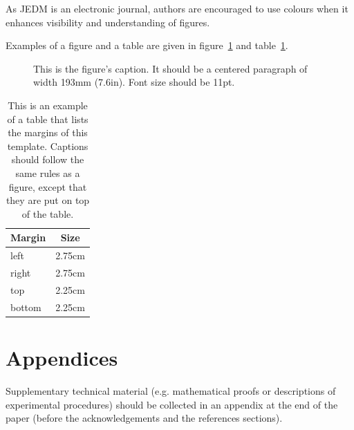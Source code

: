 \documentclass[a4,notitlepage,12pt]{jedm}
\begin{document}
As JEDM is an electronic journal, authors are encouraged to use colours when it enhances visibility and understanding of figures.

Examples of a figure and a table are given in figure~\ref{tab:fig1} and table~\ref{tab:1}.

\begin{figure}
  \centerline{}
  \caption{This is the figure's caption.  It should be a centered paragraph of width 193mm (7.6in). Font size should be 11pt.}
  \label{tab:fig1}
\end{figure}

\begin{table}
  \caption{This is an example of a table that lists the margins of this template.  Captions should follow the same rules as a figure, except that they are put on top of the table.}\vspace*{1ex}
  \label{tab:1}
  \centering
  \begin{tabular}{| l | l |}
    \hline
    \multicolumn{1}{|c|}{\textbf{Margin}} & \multicolumn{1}{c|}{\textbf{Size}} \\
    \hline
    left&2.75cm\\
    right&2.75cm\\
    top&2.25cm\\
    bottom&2.25cm\\
    \hline
  \end{tabular}
\end{table}

\section{Appendices}

Supplementary technical material (e.g. mathematical proofs or descriptions of experimental procedures) should be collected in an appendix at the end of the paper (before the acknowledgements and the references sections).
\end{document}
